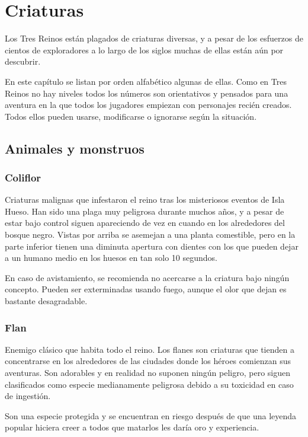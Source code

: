\chapter{Criaturas}

Los Tres Reinos están plagados de criaturas diversas, y a pesar de los esfuerzos de cientos de exploradores a lo largo de los siglos muchas de ellas están aún por descubrir. 
\par
En este capítulo se listan por orden alfabético algunas de ellas. Como en Tres Reinos no hay niveles todos los números son orientativos y pensados para una aventura en la que todos los jugadores empiezan con personajes recién creados. Todos ellos pueden usarse, modificarse o ignorarse según la situación.

\section{Animales y monstruos}

\subsection*{Coliflor}

Criaturas malignas que infestaron el reino tras los misteriosos eventos de Isla Hueso. Han sido una plaga muy peligrosa durante muchos años, y a pesar de estar bajo control siguen apareciendo de vez en cuando en los alrededores del bosque negro. Vistas por arriba se asemejan a una planta comestible, pero en la parte inferior tienen una diminuta apertura con dientes con los que pueden dejar a un humano medio en los huesos en tan solo 10 segundos. 
\par 
En caso de avistamiento, se recomienda no acercarse a la criatura bajo ningún concepto. Pueden ser exterminadas usando fuego, aunque el olor que dejan es bastante desagradable. 

\subsection*{Flan}

Enemigo clásico que habita todo el reino. Los flanes son criaturas que tienden a concentrarse en los alrededores de las ciudades donde los héroes comienzan sus aventuras. Son adorables y en realidad no suponen ningún peligro, pero siguen clasificados como especie medianamente peligrosa debido a su toxicidad en caso de ingestión. 
\par 
Son una especie protegida y se encuentran en riesgo después de que una leyenda popular hiciera creer a todos que matarlos les daría oro y experiencia. 

